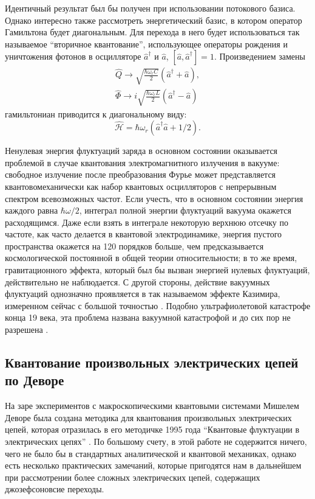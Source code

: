 \documentclass[14pt, a4paper]{extreport}
\numberwithin{equation}{section}
\begin{document}
Идентичный результат был бы получен при использовании потокового базиса. Однако интересно также рассмотреть энергетический базис, в котором оператор Гамильтона будет диагональным. Для перехода в него будет использоваться так называемое ``вторичное квантование'', использующее операторы рождения и уничтожения фотонов в осцилляторе $\hat a^\dag$ и $\hat a$, $[\hat a, \hat a^\dag] = 1$. Произведением замены 
\begin{align}
	\hat Q \rightarrow \sqrt{\frac{\hbar \omega_r C}{2}}(\hat a^\dag + \hat a),\\
	\hat \Phi \rightarrow i\sqrt{\frac{\hbar \omega_r L}{2}}(\hat a^\dag - \hat a)
\end{align}
гамильтониан приводится к диагональному виду:
\begin{equation}
	\hat{\mathcal H} =  \hbar \omega_r (\hat a^\dag \hat a + 1/2).
\end{equation}

Ненулевая энергия флуктуаций заряда в основном состоянии оказывается проблемой в случае квантования электромагнитного излучения в вакууме: свободное излучение после преобразования Фурье может представляется квантовомеханически как набор квантовых осцилляторов с непрерывным спектром всевозможных частот. Если учесть, что в основном состоянии энергия каждого равна $\hbar \omega/2$, интеграл полной энергии флуктуаций вакуума окажется расходящимся. Даже если взять в интеграле некоторую верхнюю отсечку по частоте, как часто делается в квантовой электродинамике, энергия пустого пространства окажется на 120 порядков больше, чем предсказывается космологической постоянной в общей теории относительности; в то же время, гравитационного эффекта, который был бы вызван энергией нулевых флуктуаций, действительно не наблюдается. С другой стороны, действие вакуумных флуктуаций однозначно проявляется в так называемом эффекте Казимира, измеренном сейчас с большой точностью \cite{zou2013casimir}. Подобно ультрафиолетовой катастрофе конца 19 века, эта проблема названа вакуумной катастрофой и до сих пор не разрешена \cite{adler1995vacuum}.

\subsection{Квантование произвольных электрических цепей по Деворе}

На заре экспериментов с макроскопическими квантовыми системами Мишелем Деворе была создана методика для квантования произвольных электрических цепей, которая отразилась в его методичке 1995 года ``Квантовые флуктуации в электрических цепях'' \cite{devoret1995quantum}. По большому счету, в этой работе не содержится ничего, чего не было бы в стандартных аналитической и квантовой механиках, однако есть несколько практических замечаний, которые пригодятся нам в дальнейшем при рассмотрении более сложных электрических цепей, содержащих джозефсоновсие переходы.
\end{document}
